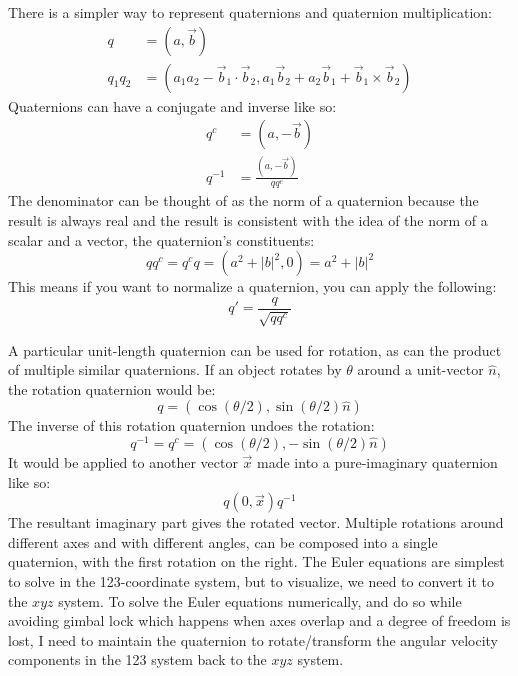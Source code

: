 \documentclass[10pt]{article}
\begin{document}
There is a simpler way to represent quaternions and quaternion multiplication:
\begin{align}
    q &= (a, \vec b) \\
    q_1q_2 &= (a_1a_2-\vec b_1\cdot\vec b_2,a_1\vec b_2+a_2\vec b_1
        +\vec b_1\times\vec b_2 )
\end{align}
Quaternions can have a conjugate and inverse like so:
\begin{align}
    q^c &= (a,-\vec b) \\
    q^{-1} &= \frac{(a,-\vec b)}{qq^c}
\end{align}
The denominator can be thought of as the norm of a quaternion because 
the result is always real and the result is consistent with the idea of the
norm of a scalar and a vector, the quaternion's constituents:
\begin{equation}
    qq^c = q^cq = (a^2 + |b|^2,0) = a^2 + |b|^2
\end{equation}
This means if you want to normalize a quaternion, you can apply the following:
\begin{equation}
    q' = \frac{q}{\sqrt{qq^c}}
\end{equation}

A particular unit-length quaternion can be used for rotation, 
as can the product of multiple similar quaternions. If an object rotates by 
$\theta$ around a unit-vector $\hat n$, the rotation quaternion would be:
\begin{equation}
    q = (\cos(\theta/2),\sin(\theta/2)\hat n)
\end{equation}
The inverse of this rotation quaternion undoes the rotation:
\begin{equation*}
    q^{-1} = q^c = (\cos(\theta/2),-\sin(\theta/2)\hat n)
\end{equation*}
It would be applied to another vector $\vec{x}$ made into a 
pure-imaginary quaternion like so:
\begin{equation}
    q(0,\vec{x})q^{-1} \label{qrotate}
\end{equation}
The resultant imaginary part gives the rotated vector. Multiple rotations 
around different axes and with different angles, 
can be composed into a single quaternion, with the first rotation on the right.
The Euler equations are simplest to solve in the 123-coordinate system, but 
to visualize, we need to convert it to the $xyz$ system. To solve 
the Euler equations numerically, and do so while avoiding gimbal lock which 
happens when axes overlap and a degree of freedom is lost, I need 
to maintain the quaternion to rotate/transform the angular velocity components 
in the 123 system back to the $xyz$ system. 
\end{document}
